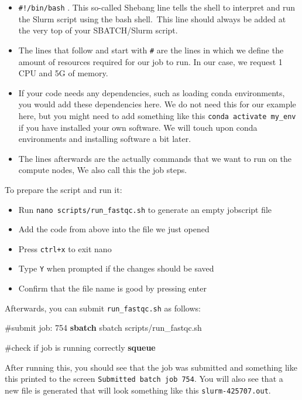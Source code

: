 \documentclass[
  letterpaper,
  DIV=11,
  numbers=noendperiod]{scrreprt}
\newenvironment{Shaded}{}{}
\newcommand{\CommentTok}[1]{\textcolor[rgb]{0.42,0.45,0.49}{#1}}
\newcommand{\ExtensionTok}[1]{\textcolor[rgb]{0.84,0.23,0.29}{\textbf{#1}}}
\newcommand{\NormalTok}[1]{\textcolor[rgb]{0.14,0.16,0.18}{#1}}
\providecommand{\tightlist}{%
  \setlength{\itemsep}{0pt}\setlength{\parskip}{0pt}}\usepackage{longtable,booktabs,array}
\begin{document}
\begin{itemize}
\item
  \texttt{\#!/bin/bash} . This so-called Shebang line tells the shell to
  interpret and run the Slurm script using the bash shell.~This line
  should always be added at the very top of your SBATCH/Slurm script.
\item
  The lines that follow and start with \texttt{\#} are the lines in
  which we define the amount of resources required for our job to run.
  In our case, we request 1 CPU and 5G of memory.
\item
  If your code needs any dependencies, such as loading conda
  environments, you would add these dependencies here. We do not need
  this for our example here, but you might need to add something like
  this \texttt{conda\ activate\ my\_env} if you have installed your own
  software. We will touch upon conda environments and installing
  software a bit later.
\item
  The lines afterwards are the actually commands that we want to run on
  the compute nodes, We also call this the job steps.
\end{itemize}

To prepare the script and run it:

\begin{itemize}
\tightlist
\item
  Run \texttt{nano\ scripts/run\_fastqc.sh} to generate an empty
  jobscript file
\item
  Add the code from above into the file we just opened
\item
  Press \texttt{ctrl+x} to exit nano
\item
  Type \texttt{Y} when prompted if the changes should be saved
\item
  Confirm that the file name is good by pressing enter
\end{itemize}

Afterwards, you can submit \texttt{run\_fastqc.sh} as follows:

\begin{Shaded}
\begin{Highlighting}[]
\CommentTok{\#submit job: 754}
\ExtensionTok{sbatch}\NormalTok{ sbatch scripts/run\_fastqc.sh}

\CommentTok{\#check if job is running correctly}
\ExtensionTok{squeue}
\end{Highlighting}
\end{Shaded}

After running this, you should see that the job was submitted and
something like this printed to the screen
\texttt{Submitted\ batch\ job\ 754}. You will also see that a new file
is generated that will look something like this
\texttt{slurm-425707.out}.
\end{document}
